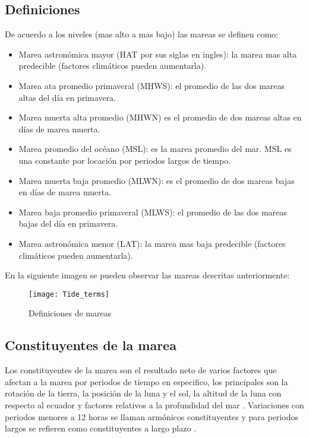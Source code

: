 \documentclass[12pt,letterpaper]{article}
\begin{document}
\subsection{Definiciones}
De acuerdo a los niveles (mas alto a mas bajo) las mareas se definen como\cite{a}:

\begin{itemize}
\item Marea astronómica mayor (HAT por sus siglas en ingles): la marea mas alta predecible (factores climáticos pueden aumentarla).
\item Marea ata promedio primaveral (MHWS): el promedio de las dos mareas altas del día en primavera.
\item Marea muerta alta promedio (MHWN) es el promedio de dos mareas altas en días de marea muerta.
\item Marea promedio del océano (MSL): es la marea promedio del mar. MSL es una constante por locación por periodos largos de tiempo.
\item Marea muerta baja promedio (MLWN): es el promedio de dos mareas bajas en días de marea muerta.
\item Marea baja promedio primaveral (MLWS): el promedio de las dos mareas bajas del día en primavera.
\item Marea astronómica menor (LAT): la marea mas baja predecible (factores climáticos pueden aumentarla).
\end{itemize}

En la siguiente imagen se pueden observar las mareas descritas anteriormente:
\begin{figure}[H]
	\centering
	\texttt{[image: Tide\_terms]}
	\caption{Definiciones de mareas \cite{a}}
\end{figure}

\subsection{Constituyentes de la marea}

Los constituyentes de la marea son el resultado neto de varios factores que afectan a la marea por periodos de tiempo en especifico, los principales son la rotación de la tierra, la posición de la luna y el sol, la altitud de la luna con respecto al ecuador y factores relativos a la profundidad del mar \cite{a}.
Variaciones con periodos menores a 12 horas se llaman armónicos constituyentes y para periodos largos se refieren como constituyentes a largo plazo \cite{a}.\\
\end{document}

